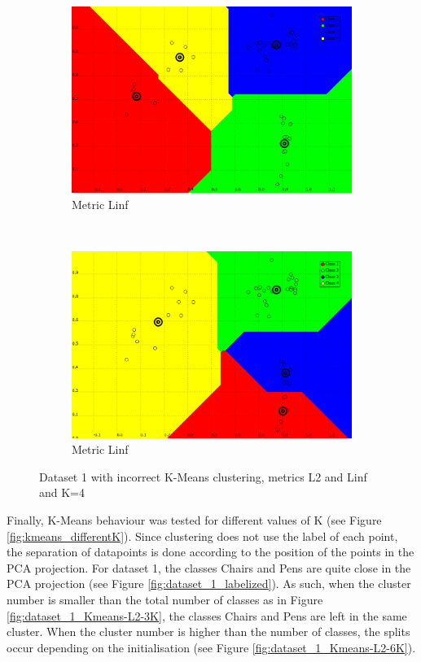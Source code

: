 \documentclass[a4paper,10pt]{article}
\begin{document}
\begin{figure}[H]
\begin{subfigure}[t]{0.2\textwidth}
      \includegraphics[width=\textwidth]{pictures/dataset_1_Kmeans-4K-Linf-wrong}
      \caption{Metric Linf}
      \label{fig:dataset_1_Kmeans-4K-Linf-wrong}
     \end{subfigure}
      ~
    \begin{subfigure}[t]{0.2\textwidth}
      \centering
      \includegraphics[width=\textwidth]{pictures/dataset_1_Kmeans-4K-Linf-wrong2}
      \caption{Metric Linf}
      \label{fig:dataset_1_Kmeans-4K-Linf-wrong2}
     \end{subfigure}
     \caption{Dataset 1 with incorrect K-Means clustering, metrics L2 and Linf and K=4}
     \label{fig:bad_kmeans}
\end{figure}

Finally, K-Means behaviour was tested for different values of K (see Figure \ref{fig:kmeans_differentK}). Since clustering does not use the label of each point, the separation of datapoints is done according to the position of the points in the PCA projection. For dataset 1, the classes Chairs and Pens are quite close in the PCA projection (see Figure \ref{fig:dataset_1_labelized}). As such, when the cluster number is smaller than the total number of classes as in Figure \ref{fig:dataset_1_Kmeans-L2-3K}, the classes Chairs and Pens are left in the same cluster. When the cluster number is higher than the number of classes, the splits occur depending on the initialisation (see Figure \ref{fig:dataset_1_Kmeans-L2-6K}).
\end{document}
